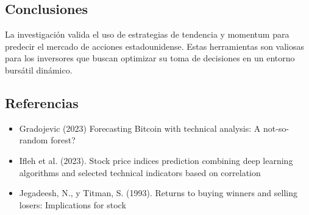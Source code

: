\documentclass[a0,portrait]{a0poster}
\newcommand{\customsection}[1]{
    \begin{center}
        \begin{tcolorbox}[colframe=miRojo!50, colback=miRojo, width=\linewidth, boxrule=1mm, arc=3mm, auto outer arc]
            \centering
            \vspace{.5cm} %
            \color{white}
            \section*{ \textbf{\Huge #1}}  %
            \vspace{.2cm} %
        \end{tcolorbox}
    \end{center}
}
\begin{document}
\begin{multicols}{2}
    \vspace{1cm}

    \customsection{Conclusiones}
    \par
    \indent La investigación valida el uso de estrategias de tendencia y momentum para predecir el mercado de acciones 
    estadounidense. Estas herramientas son valiosas para los inversores que buscan optimizar su toma de decisiones en un 
    entorno bursátil dinámico. 
    \customsection{Referencias}
    \par
         \begin{itemize}
            \vspace{-,5 cm}
            \item Gradojevic (2023) Forecasting Bitcoin with technical analysis: A not-so-random forest?
            \vspace{-1 cm}
            \item Ifleh et al. (2023). Stock price indices prediction combining deep learning algorithms and selected technical 
            indicators based on correlation
            \vspace{-1 cm}
            \item Jegadeesh, N., y Titman, S. (1993). Returns to buying winners and selling losers: Implications for stock 

\end{itemize}
\end{multicols}
\end{document}
